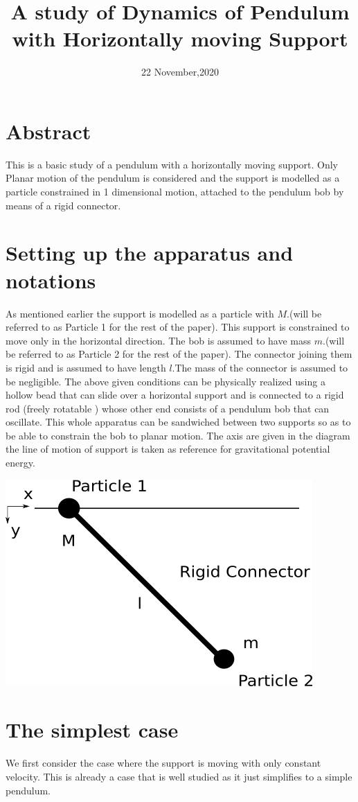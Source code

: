 \documentclass{article}
\title{A study of Dynamics of Pendulum with Horizontally moving Support}
\date{22 November,2020}
\begin{document}
	\maketitle
	\section*{Abstract}
	This is a basic study of a pendulum with a horizontally moving support. Only Planar motion of the pendulum is considered and the support is modelled as a particle constrained in 1 dimensional motion, attached to the pendulum bob by means of a rigid connector.
	
	\section*{Setting up the apparatus and notations}
	As mentioned earlier the support is modelled as a particle with $ M $.(will be referred to as Particle 1 for the rest of the paper). This support is constrained to move only in the horizontal direction. The bob is assumed to have mass $ m $.(will be referred to as Particle 2 for the rest of the paper). The connector joining them is rigid and is assumed to have length $ l $.The mass of the connector is assumed to be negligible. The above given conditions can be physically realized using a hollow bead that can slide over a horizontal support and is connected to a rigid rod (freely rotatable ) whose other end consists of a pendulum bob that can oscillate. This whole apparatus can be sandwiched between two supports so as to be able to constrain the bob to planar motion.
	The axis are given in the diagram the line of motion of support is taken as reference for gravitational potential energy.
		
		
		\includegraphics[width=0.5\linewidth]{PendulumDiagram.png}
		
		
		
		
	\section{The simplest case}
	We first consider the case where the support is moving with only constant velocity. This is already a case that is well studied as it just simplifies to a simple pendulum.
	
\end{document}
